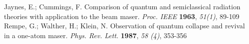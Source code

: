 \documentclass[atoms,article,submit,moreauthors,dvi2pdf,12pt,a4paper]{mdpi}
\begin{document}

\makeatletter
\renewcommand\@biblabel[1]{#1. }
\makeatother
\begin{thebibliography}{999} %
Jaynes, E.; Cummings, F. Comparison of quantum and semiclassical radiation theories with application to the beam maser. {\em Proc. IEEE} {\bf 1963}, {\em 51(1)}, 89-109
Rempe, G.; Walther, H.; Klein, N. Observation of quantum collapse and revival in a one-atom maser. {\em Phys. Rev. Lett.} {\bf 1987}, {\em 58 (4)}, 353-356

\end{thebibliography}
\end{document}
